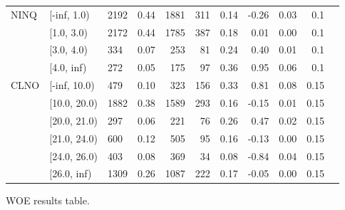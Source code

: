 \begin{landscape}
\begin{figure}[!ht]
\begin{tabular}{lllrrrrrrrr}
			\midrule
			     NINQ &  [-inf, 1.0) &   2192 &         0.44 &  1881 &  311 &     0.14 & -0.26 &    0.03 &       0.1 \\
	     &   [1.0, 3.0) &   2172 &         0.44 &  1785 &  387 &     0.18 &  0.01 &    0.00 &       0.1 \\
	     &   [3.0, 4.0) &    334 &         0.07 &   253 &   81 &     0.24 &  0.40 &    0.01 &       0.1 \\
	     &   [4.0, inf) &    272 &         0.05 &   175 &   97 &     0.36 &  0.95 &    0.06 &       0.1 \\
			\midrule
			     CLNO &  [-inf, 10.0) &    479 &         0.10 &   323 &  156 &     0.33 &  0.81 &    0.08 &      0.15 \\
     &  [10.0, 20.0) &   1882 &         0.38 &  1589 &  293 &     0.16 & -0.15 &    0.01 &      0.15 \\
     &  [20.0, 21.0) &    297 &         0.06 &   221 &   76 &     0.26 &  0.47 &    0.02 &      0.15 \\
     &  [21.0, 24.0) &    600 &         0.12 &   505 &   95 &     0.16 & -0.13 &    0.00 &      0.15 \\
     &  [24.0, 26.0) &    403 &         0.08 &   369 &   34 &     0.08 & -0.84 &    0.04 &      0.15 \\
     &   [26.0, inf) &   1309 &         0.26 &  1087 &  222 &     0.17 & -0.05 &    0.00 &      0.15 \\
			\bottomrule
		\end{tabular}
		\caption{WOE results table. \label{woe_2}}
	\end{figure}
\end{landscape}